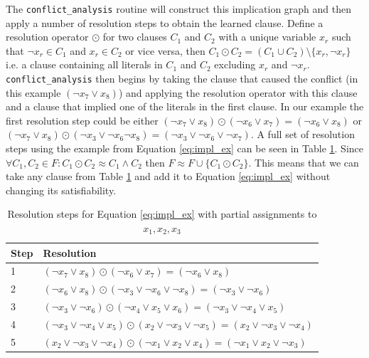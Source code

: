 The \texttt{conflict\_analysis} routine will construct this implication graph and then apply
a number of resolution steps to obtain the learned clause. Define a resolution operator $\odot$ for
two clauses $C_1$ and $C_2$ with a unique variable $x_r$ such that $\neg x_r \in C_1$ and $x_r \in C_2$ or
vice versa, then $C_1 \odot C_2 = (C_1 \cup C_2) \setminus \{x_r, \neg x_r\}$ i.e. a clause containing
all literals in $C_1$ and $C_2$ excluding $x_r$ and $\neg x_r$. \texttt{conflict\_analysis} then begins by
taking the clause that caused the conflict (in this example $(\neg x_7 \lor x_8)$) and applying the resolution
operator with this clause and a clause that implied one of the literals in the first clause. In our example
the first resolution step could be either $(\neg x_7 \lor x_8) \odot (\neg x_6 \lor x_7) = (\neg x_6 \lor x_8)$ or 
$(\neg x_7 \lor x_8) \odot (\neg x_3 \lor \neg x_6 \neg x_8) = (\neg x_3 \lor \neg x_6 \lor \neg x_7)$.
A full set of resolution steps using the example from Equation \ref{eq:impl_ex} can be seen in Table \ref{tab:resolutions}.
Since $\forall C_1, C_2 \in F : C_1 \odot C_2 \approx C_1 \land C_2$ then $F \approx F \cup \{C_1 \odot C_2\}$. This means
that we can take any clause from Table \ref{tab:resolutions} and add it to Equation \ref{eq:impl_ex} without changing
its satisfiability.

\begin{table}[]
    \centering
    \begin{tabular}{l l}
    \toprule
        Step & Resolution \\
    \midrule
        1 & $(\neg x_7 \lor x_8) \odot (\neg x_6 \lor x_7) = (\neg x_6 \lor x_8)$ \\
        2 & $(\neg x_6 \lor x_8) \odot (\neg x_3 \lor \neg x_6 \lor \neg x_8) = (\neg x_3 \lor \neg x_6)$ \\
        3 & $(\neg x_3 \lor \neg x_6) \odot (\neg x_4 \lor x_5 \lor x_6) = (\neg x_3 \lor \neg x_4 \lor x_5)$ \\
        4 & $(\neg x_3 \lor \neg x_4 \lor x_5) \odot (x_2 \lor \neg x_3 \lor \neg x_5) = (x_2 \lor \neg x_3 \lor \neg x_4)$ \\
        5 & $(x_2 \lor \neg x_3 \lor \neg x_4) \odot (\neg x_1 \lor x_2 \lor x_4) = (\neg x_1 \lor x_2 \lor \neg x_3)$ \\
    \bottomrule
    \end{tabular}
    \caption{Resolution steps for Equation \ref{eq:impl_ex} with partial assignments to $x_1, x_2, x_3$}
    \label{tab:resolutions}
\end{table}

